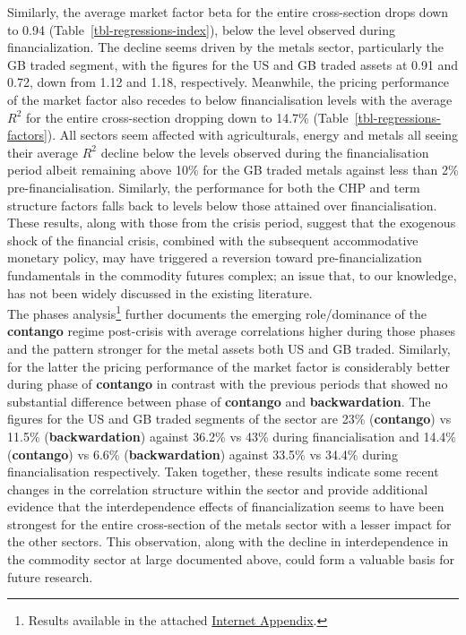 \documentclass[
  authoryear,
  preprint,
  3p]{elsarticle}
\begin{document}
Similarly, the average market factor beta for the entire cross-section
drops down to 0.94 (Table~\ref{tbl-regressions-index}), below the level
observed during financialization. The decline seems driven by the metals
sector, particularly the GB traded segment, with the figures for the US
and GB traded assets at 0.91 and 0.72, down from 1.12 and 1.18,
respectively. Meanwhile, the pricing performance of the market factor
also recedes to below financialisation levels with the average \(R^{2}\)
for the entire cross-section dropping down to 14.7\%
(Table~\ref{tbl-regressions-factors}). All sectors seem affected with
agriculturals, energy and metals all seeing their average \(R^{2}\)
decline below the levels observed during the financialisation period
albeit remaining above 10\% for the GB traded metals against less than
2\% pre-financialisation. Similarly, the performance for both the CHP
and term structure factors falls back to levels below those attained
over financialisation. These results, along with those from the crisis
period, suggest that the exogenous shock of the financial crisis,
combined with the subsequent accommodative monetary policy, may have
triggered a reversion toward pre-financialization fundamentals in the
commodity futures complex; an issue that, to our knowledge, has not been
widely discussed in the existing literature.\\
The phases analysis\footnote{Results available in the attached
  \href{https://bautheac.shinyapps.io/co-movement/}{Internet Appendix}.}
further documents the emerging role/dominance of the \textbf{contango}
regime post-crisis with average correlations higher during those phases
and the pattern stronger for the metal assets both US and GB traded.
Similarly, for the latter the pricing performance of the market factor
is considerably better during phase of \textbf{contango} in contrast
with the previous periods that showed no substantial difference between
phase of \textbf{contango} and \textbf{backwardation}. The figures for
the US and GB traded segments of the sector are 23\% (\textbf{contango})
vs 11.5\% (\textbf{backwardation}) against 36.2\% vs 43\% during
financialisation and 14.4\% (\textbf{contango}) vs 6.6\%
(\textbf{backwardation}) against 33.5\% vs 34.4\% during
financialisation respectively. Taken together, these results indicate
some recent changes in the correlation structure within the sector and
provide additional evidence that the interdependence effects of
financialization seems to have been strongest for the entire
cross-section of the metals sector with a lesser impact for the other
sectors. This observation, along with the decline in interdependence in
the commodity sector at large documented above, could form a valuable
basis for future research.
\end{document}

